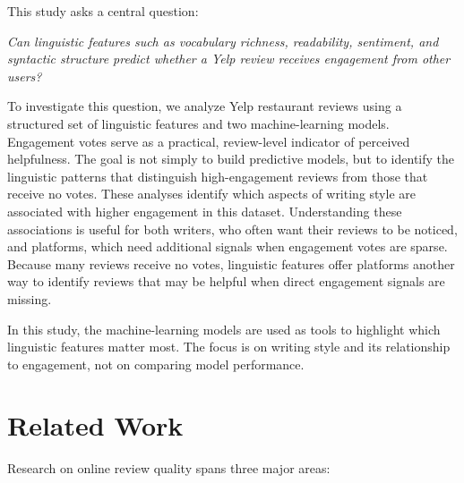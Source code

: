 \documentclass[12pt]{article}
\begin{document}
This study asks a central question:

\emph{Can linguistic features such as vocabulary richness, readability, sentiment, and syntactic structure predict whether a Yelp review receives engagement from other users?}

To investigate this question, we analyze Yelp restaurant reviews using a structured set of linguistic features and two machine-learning models. Engagement votes serve as a practical, review-level indicator of perceived helpfulness. The goal is not simply to build predictive models, but to identify the linguistic patterns that distinguish high-engagement reviews from those that receive no votes. These analyses identify which aspects of writing style are associated with higher engagement in this dataset. Understanding these associations is useful for both writers, who often want their reviews to be noticed, and platforms, which need additional signals when engagement votes are sparse. Because many reviews receive no votes, linguistic features offer platforms another way to identify reviews that may be helpful when direct engagement signals are missing.

In this study, the machine-learning models are used as tools to highlight which linguistic features matter most. The focus is on writing style and its relationship to engagement, not on comparing model performance.

\section{Related Work}

Research on online review quality spans three major areas:
\end{document}
